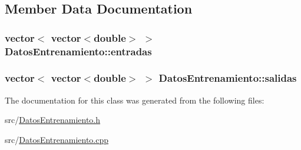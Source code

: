 \subsection{Member Data Documentation}
\hypertarget{classDatosEntrenamiento_abefc5a5c4c2cdc1b53d1a4cc2a748d32}{
\subsubsection[{entradas}]{\setlength{\rightskip}{0pt plus 5cm}vector$<$ vector$<$double$>$ $>$ Datos\-Entrenamiento\-::entradas\hspace{0.3cm}{\ttfamily [private]}}}\label{classDatosEntrenamiento_abefc5a5c4c2cdc1b53d1a4cc2a748d32}
\hypertarget{classDatosEntrenamiento_ac262fa4f8738dfa4487efe69cce601be}{
\subsubsection[{salidas}]{\setlength{\rightskip}{0pt plus 5cm}vector$<$ vector$<$double$>$ $>$ Datos\-Entrenamiento\-::salidas\hspace{0.3cm}{\ttfamily [private]}}}\label{classDatosEntrenamiento_ac262fa4f8738dfa4487efe69cce601be}


The documentation for this class was generated from the following files\-:\begin{DoxyCompactItemize}
\item 
src/\hyperlink{DatosEntrenamiento_8h}{Datos\-Entrenamiento.\-h}\item 
src/\hyperlink{DatosEntrenamiento_8cpp}{Datos\-Entrenamiento.\-cpp}\end{DoxyCompactItemize}

